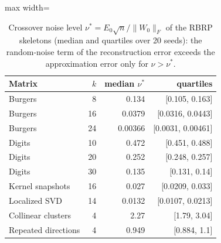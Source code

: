 \begin{table}[t]
\centering\small
\caption{Crossover noise level $\nu^*=E_0\sqrt n/\|W_0\|_F$ of the RBRP skeletons (median and quartiles over 20 seeds): the random-noise term of the reconstruction error exceeds the approximation error only for $\nu>\nu^*$.}\label{tab:nustar}
\begin{adjustbox}{max width=\linewidth}
\begin{tabular}{lrrr}
\toprule
Matrix & $k$ & median $\nu^*$ & quartiles \\
\midrule
Burgers & 8 & 0.134 & [0.105, 0.163] \\
Burgers & 16 & 0.0379 & [0.0316, 0.0443] \\
Burgers & 24 & 0.00366 & [0.0031, 0.00461] \\
Digits & 10 & 0.472 & [0.451, 0.488] \\
Digits & 20 & 0.252 & [0.248, 0.257] \\
Digits & 30 & 0.135 & [0.131, 0.14] \\
Kernel snapshots & 16 & 0.027 & [0.0209, 0.033] \\
Localized SVD & 14 & 0.0132 & [0.0107, 0.0213] \\
Collinear clusters & 4 & 2.27 & [1.79, 3.04] \\
Repeated directions & 4 & 0.949 & [0.884, 1.1] \\
\bottomrule
\end{tabular}
\end{adjustbox}
\end{table}
